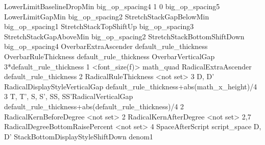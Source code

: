 \MathLine{\Umathlimitbelowbgap}           {}   {}                     {LowerLimitBaselineDropMin}               {big_op_spacing4}
\MathLine{\Umathlimitbelowkern}           {1}  {}                     {0}                                       {big_op_spacing5}
\MathLine{\Umathlimitbelowvgap}           {}   {}                     {LowerLimitGapMin}                        {big_op_spacing2}
\MathLine{\Umathoverdelimitervgap}        {}   {}                     {StretchStackGapBelowMin}                 {big_op_spacing1}
\MathLine{\Umathoverdelimiterbgap}        {}   {}                     {StretchStackTopShiftUp}                  {big_op_spacing3}
\MathLine{\Umathunderdelimitervgap}       {}   {}                     {StretchStackGapAboveMin}                 {big_op_spacing2}
\MathLine{\Umathunderdelimiterbgap}       {}   {}                     {StretchStackBottomShiftDown}             {big_op_spacing4}
\MathLine{\Umathoverbarkern}              {}   {}                     {OverbarExtraAscender}                    {default_rule_thickness}
\MathLine{\Umathoverbarrule}              {}   {}                     {OverbarRuleThickness}                    {default_rule_thickness}
\MathLine{\Umathoverbarvgap}              {}   {}                     {OverbarVerticalGap}                      {3*default_rule_thickness}
\MathLine{\Umathquad}                     {1}  {}                     {<font_size(f)>}                          {math_quad}
\MathLine{\Umathradicalkern}              {}   {}                     {RadicalExtraAscender}                    {default_rule_thickness}
\MathLine{\Umathradicalrule}              {2}  {}                     {RadicalRuleThickness}                    {<not set>}
\MathLine{\Umathradicalvgap}              {3}  {D, D'}                {RadicalDisplayStyleVerticalGap}          {default_rule_thickness+abs(math_x_height)/4}
\MathLine{\Umathradicalvgap}              {3}  {T, T', S, S', SS, SS'}{RadicalVerticalGap}                      {default_rule_thickness+abs(default_rule_thickness)/4}
\MathLine{\Umathradicaldegreebefore}      {2}  {}                     {RadicalKernBeforeDegree}                 {<not set>}
\MathLine{\Umathradicaldegreeafter}       {2}  {}                     {RadicalKernAfterDegree}                  {<not set>}
\MathLine{\Umathradicaldegreeraise}       {2,7}{}                     {RadicalDegreeBottomRaisePercent}         {<not set>}
\MathLine{\Umathspaceafterscript}         {4}  {}                     {SpaceAfterScript}                        {script_space}
\MathLine{\Umathstackdenomdown}           {}   {D, D'}                {StackBottomDisplayStyleShiftDown}        {denom1}
